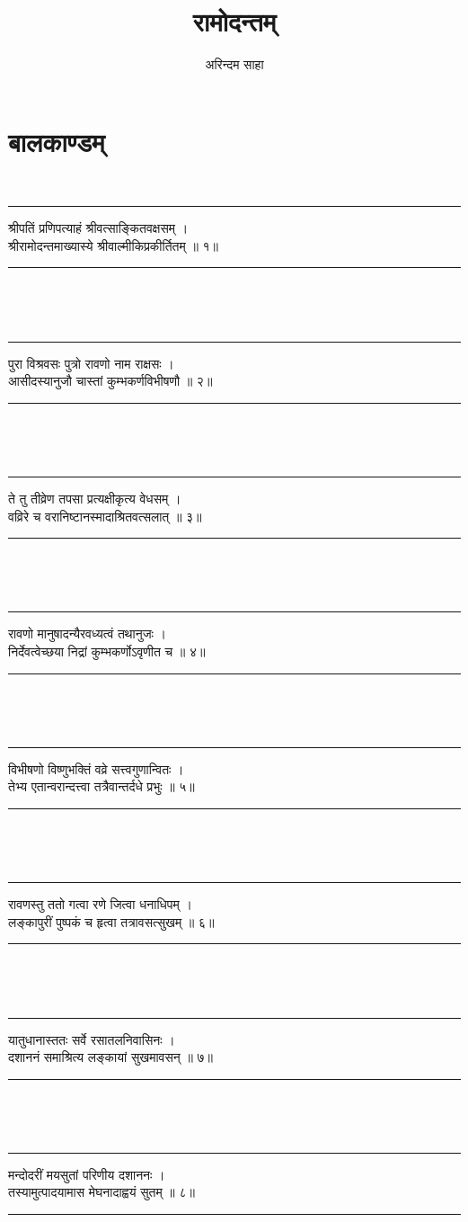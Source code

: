 \documentclass[a4paper,10pt]{report}
\author{अरिन्दम साहा}
\title{रामोदन्तम्}
\newenvironment{moola}
{
~\\
\hrule
\begin{center}
\begin{LARGE}
}
{
\end{LARGE}
\end{center}
\hrule
~\\
}
\begin{document}
\maketitle

\chapter{बालकाण्डम्}

\begin{moola}
श्रीपतिं प्रणिपत्याहं श्रीवत्साङ्कितवक्षसम् ।\\
श्रीरामोदन्तमाख्यास्ये श्रीवाल्मीकिप्रकीर्तितम् ॥ १॥ 
\end{moola}


\begin{moola}
पुरा विश्रवसः पुत्रो रावणो नाम राक्षसः ।\\
आसीदस्यानुजौ चास्तां कुम्भकर्णविभीषणौ ॥ २॥
\end{moola}

\begin{moola}
ते तु तीव्रेण तपसा प्रत्यक्षीकृत्य वेधसम् ।\\
वव्रिरे च वरानिष्टानस्मादाश्रितवत्सलात् ॥ ३॥
\end{moola}

\begin{moola}
रावणो मानुषादन्यैरवध्यत्वं तथानुजः ।\\
निर्देवत्वेच्छया निद्रां कुम्भकर्णोऽवृणीत च ॥ ४॥
\end{moola}

\begin{moola}
विभीषणो विष्णुभक्तिं वव्रे सत्त्वगुणान्वितः ।\\
तेभ्य एतान्वरान्दत्त्वा तत्रैवान्तर्दधे प्रभुः ॥ ५॥
\end{moola}

\begin{moola}
रावणस्तु ततो गत्वा रणे जित्वा धनाधिपम् ।\\
लङ्कापुरीं पुष्पकं च हृत्वा तत्रावसत्सुखम् ॥ ६॥
\end{moola}

\begin{moola}
यातुधानास्ततः सर्वे रसातलनिवासिनः ।\\
दशाननं समाश्रित्य लङ्कायां सुखमावसन् ॥ ७॥
\end{moola}

\begin{moola}
मन्दोदरीं मयसुतां परिणीय दशाननः ।\\
तस्यामुत्पादयामास मेघनादाह्वयं सुतम् ॥ ८॥
\end{moola}
\end{document}
